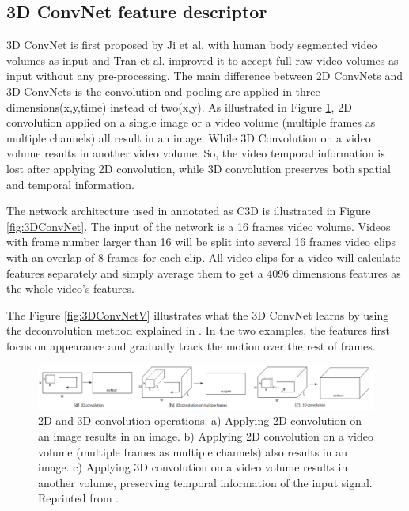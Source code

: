 \subsection{3D ConvNet feature descriptor}
\label{2_3_3}
3D ConvNet is first proposed by Ji et al. \cite{Ji2013} with human body segmented video volumes as input and Tran et al. \cite{Tran2015} improved it to accept full raw video volumes as input without any pre-processing. The main difference between 2D ConvNets and 3D ConvNets is the convolution and pooling are applied in three dimensions(x,y,time) instead of two(x,y). As illustrated in Figure \ref{fig:3DConv}, 2D convolution applied on a single image or a video volume (multiple frames as multiple channels) all result in an image. While 3D Convolution on a video volume results in another video volume. So, the video temporal information is lost after applying 2D convolution, while 3D convolution preserves both spatial and temporal information. 
\par 
The network architecture used in \cite{Tran2015} annotated as C3D is illustrated in Figure \ref{fig:3DConvNet}. The input of the network is a 16 frames video volume. Videos with frame number larger than 16 will be split into several 16 frames video clips with an overlap of 8 frames for each clip. All video clips for a video will calculate features separately and simply average them to get a 4096 dimensions features as the whole video's features. 
\par
The Figure \ref{fig:3DConvNetV} illustrates what the 3D ConvNet learns by using the deconvolution method explained in \cite{zeiler2014}. In the two examples, the features first focus on appearance and gradually track the motion over the rest of frames. 

\begin{figure}
	\includegraphics[width=\linewidth]{figs/3DConv.png}
	\caption{2D and 3D convolution operations. a) Applying 2D convolution on an image results in an image. b) Applying 2D convolution
		on a video volume (multiple frames as multiple channels) also results in an image. c) Applying 3D convolution on a video volume results
		in another volume, preserving temporal information of the input signal. Reprinted from \cite{Tran2015}.}
	\label{fig:3DConv}
\end{figure}

